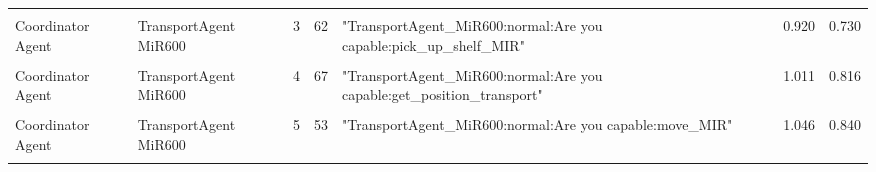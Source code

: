 \begin{table}[b]
\begin{tabular}{m{} m{} m{} m{} m{} m{} m{}}
    & & & & & &\\
    Coordinator Agent & TransportAgent MiR600 & 3  & 62  & "TransportAgent\_MiR600:normal:Are you capable:pick\_up\_shelf\_MIR"                                                                                                                                                                                                                                                                                                                                                                                                                                                                                                                                                                                                                     & 0.920 & 0.730 \\ 
    & & & & & &\\
    Coordinator Agent & TransportAgent MiR600 & 4  & 67  & "TransportAgent\_MiR600:normal:Are you capable:get\_position\_transport"                                                                                                                                                                                                                                                                                                                                                                                                                                                                                                                                                                                                                 & 1.011 & 0.816 \\ 
    & & & & & &\\
    Coordinator Agent & TransportAgent MiR600 & 5  & 53  & "TransportAgent\_MiR600:normal:Are you capable:move\_MIR"                                                                                                                                                                                                                                                                                                                                                                                                                                                                                                                                                                                                                                & 1.046 & 0.840 \\ 
    & & & & & &\\

\end{tabular}
\end{table}
